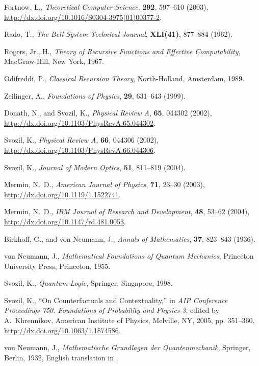 \begin{thebibliography}{10}
Fortnow, L., \emph{Theoretical Computer Science}, \textbf{292}, 597--610
  (2003), \urlprefix\url{http://dx.doi.org/10.1016/S0304-3975(01)00377-2}.

Rado, T., \emph{The Bell System Technical Journal}, \textbf{XLI(41)}, 877--884
  (1962).

{Rogers, Jr.}, H., \emph{Theory of Recursive Functions and Effective
  Computability}, MacGraw-Hill, New York, 1967.

Odifreddi, P., \emph{Classical Recursion Theory}, North-Holland, Amsterdam,
  1989.

Zeilinger, A., \emph{Foundations of Physics}, \textbf{29}, 631--643 (1999).

Donath, N., and Svozil, K., \emph{Physical Review A}, \textbf{65}, 044302
  (2002), \urlprefix\url{http://dx.doi.org/10.1103/PhysRevA.65.044302}.

Svozil, K., \emph{Physical Review A}, \textbf{66}, 044306 (2002),
  \urlprefix\url{http://dx.doi.org/10.1103/PhysRevA.66.044306}.

Svozil, K., \emph{Journal of Modern Optics}, \textbf{51}, 811--819 (2004).

Mermin, N.~D., \emph{American Journal of Physics}, \textbf{71}, 23--30 (2003),
  \urlprefix\url{http://dx.doi.org/10.1119/1.1522741}.

Mermin, N.~D., \emph{IBM Journal of Research and Development}, \textbf{48},
  53--62 (2004), \urlprefix\url{http://dx.doi.org/10.1147/rd.481.0053}.

Birkhoff, G., and von Neumann, J., \emph{Annals of Mathematics}, \textbf{37},
  823--843 (1936).

von Neumann, J., \emph{Mathematical Foundations of Quantum Mechanics},
  Princeton University Press, Princeton, 1955.

Svozil, K., \emph{Quantum Logic}, Springer, Singapore, 1998.

Svozil, K., \enquote{On Counterfactuals and Contextuality,} in \emph{AIP
  Conference Proceedings 750. {F}oundations of Probability and Physics-3},
  edited by A.~Khrennikov, American Institute of Physics, Melville, NY, 2005,
  pp. 351--360, \urlprefix\url{http://dx.doi.org/10.1063/1.1874586}.

von Neumann, J., \emph{Mathematische Grundlagen der Quantenmechanik}, Springer,
  Berlin, 1932, {E}nglish translation in \cite{v-neumann-55}.


\end{thebibliography}
